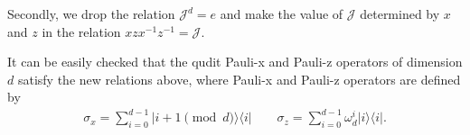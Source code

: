 \documentclass[11pt,letterpaper]{article}
\newcommand{\ket}[1]{|#1\rangle}
\newcommand{\ketbra}[2]{|#1\rangle\langle#2|}
\newcommand{\1}{\mathbb{1}}
\newcommand{\J}{\mathcal{J}}
\theoremstyle{definition}
\begin{document}
Secondly, we drop the relation $\J^d = e$ and make the value of $\J$ determined by $x$ and $z$ in the 
relation $xzx^{-1}z^{-1} = \J$.

It can be easily checked that the qudit Pauli-x and Pauli-z operators of dimension $d$ satisfy the new relations 
above, where Pauli-x and Pauli-z operators are defined by
\begin{align}
	\sigma_x = \sum_{i=0}^{d-1} \ketbra{i+1 \pmod{d} }{i}  \quad \quad
	\sigma_z = \sum_{i=0}^{d-1} \omega_d^i \ketbra{i}{i}.
\end{align}
\end{document}
